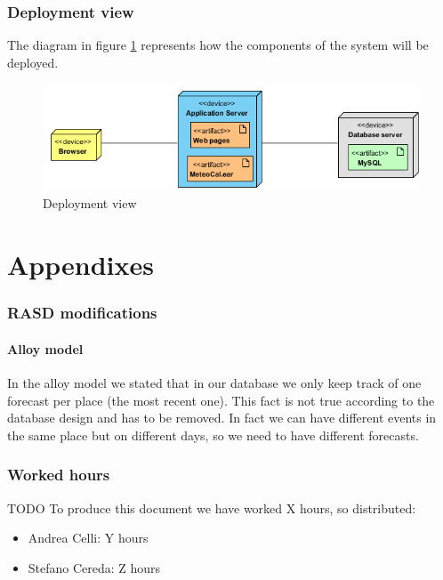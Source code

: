 \documentclass[10pt,a4paper,titlepage]{article}
\begin{document}
\section{Deployment view}
The diagram in figure \ref{fig:deployment_view} represents how the components of the system will be deployed.
\begin{figure}[h]
\centering
\includegraphics[width=\linewidth]{./images/deployment_view}
\caption[deploy]{Deployment view}
\label{fig:deployment_view}
\end{figure}

\clearpage
\part{Appendixes}
\label{part:appendixes}
\section{RASD modifications}
\subsection{Alloy model}
In the alloy model we stated that in our database we only keep track of one forecast per place (the most recent one). This fact is not true according to the database design and has to be removed. In fact we can have different events in the same place but on different days, so we need to have different forecasts.

\section{Worked hours}
TODO
To produce this document we have worked X hours, so distributed:
\begin{itemize}
\item Andrea Celli: Y hours
\item Stefano Cereda: Z hours
\end{itemize}

\clearpage
\tableofcontents
\end{document}
